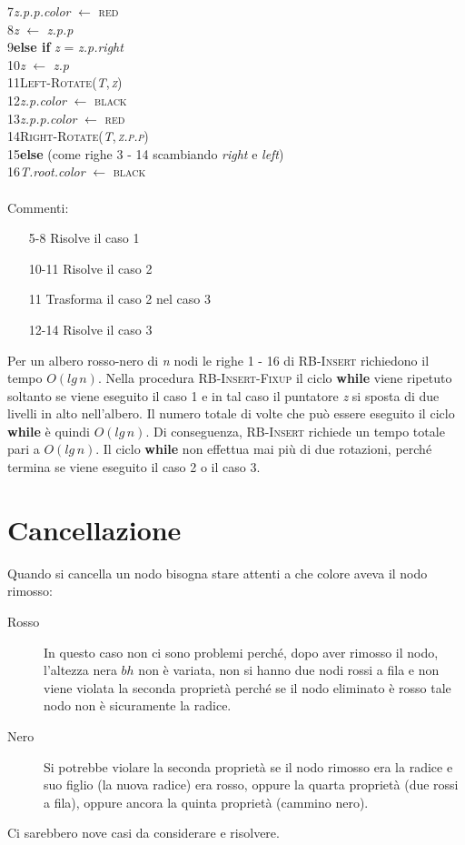 \documentclass[10pt, a4paper]{report}
\newcommand\firsttab[1][0.5cm]{\hspace*{#1}}
\newcommand\secondtab[1][1cm]{\hspace*{#1}}
\newcommand\thirdtab[1][1.5cm]{\hspace*{#1}}
\newcommand\fourthtab[1][2cm]{\hspace*{#1}}
\newcommand\fifthtab[1][2.5cm]{\hspace*{#1}}
\begin{document}
7\fourthtab\textit{z.p.p.color} $\leftarrow$ \textsc{red}\\
8\fourthtab\textit{z} $\leftarrow$ \textit{z.p.p}\\
9\thirdtab\textbf{else if} \textit{z} = \textit{z.p.right}\\
10\fifthtab\textit{z} $\leftarrow$ \textit{z.p}\\
11\fifthtab\textsc{Left-Rotate(\textit{T},\,\textit{z})}\\
12\fourthtab\textit{z.p.color} $\leftarrow$ \textsc{black}\\
13\fourthtab\textit{z.p.p.color} $\leftarrow$ \textsc{red}\\
14\fourthtab\textsc{Right-Rotate(\textit{T},\,\textit{z.p.p})}\\
15\secondtab\textbf{else} (come righe 3 - 14 scambiando \textit{right} e \textit{left})\\
16\firsttab\textit{T.root.color} $\leftarrow$ \textsc{black}\\\\
Commenti:
\begin{enumerate}
\item[5-8]Risolve il caso 1
\item[10-11]Risolve il caso 2
\item[11]Trasforma il caso 2 nel caso 3
\item[12-14]Risolve il caso 3
\end{enumerate}
Per un albero rosso-nero di \textit{n} nodi le righe 1 - 16 di \textsc{RB-Insert} richiedono il tempo $O(lg\,n)$. Nella procedura \textsc{RB-Insert-Fixup} il ciclo \textbf{while} viene ripetuto soltanto se viene eseguito il caso 1 e in tal caso il puntatore \textit{z} si sposta di due livelli in alto nell'albero. Il numero totale di volte che può essere eseguito il ciclo \textbf{while} è quindi $O(lg\,n)$. Di conseguenza, \textsc{RB-Insert} richiede un tempo totale pari a $O(lg\,n)$. Il ciclo \textbf{while} non effettua mai più di due rotazioni, perché termina se viene eseguito il caso 2 o il caso 3. 
\section{Cancellazione}
Quando si cancella un nodo bisogna stare attenti a che colore aveva il nodo rimosso:
\begin{description}
\item[Rosso]In questo caso non ci sono problemi perché, dopo aver rimosso il nodo, l'altezza nera $bh$ non è variata, non si hanno due nodi rossi a fila e non viene violata la seconda proprietà perché se il nodo eliminato è rosso tale nodo non è sicuramente la radice.
\item[Nero]Si potrebbe violare la seconda proprietà se il nodo rimosso era la radice e suo figlio (la nuova radice) era rosso, oppure la quarta proprietà (due rossi a fila), oppure ancora la quinta proprietà (cammino nero).
\end{description}
Ci sarebbero nove casi da considerare e risolvere.
\end{document}
